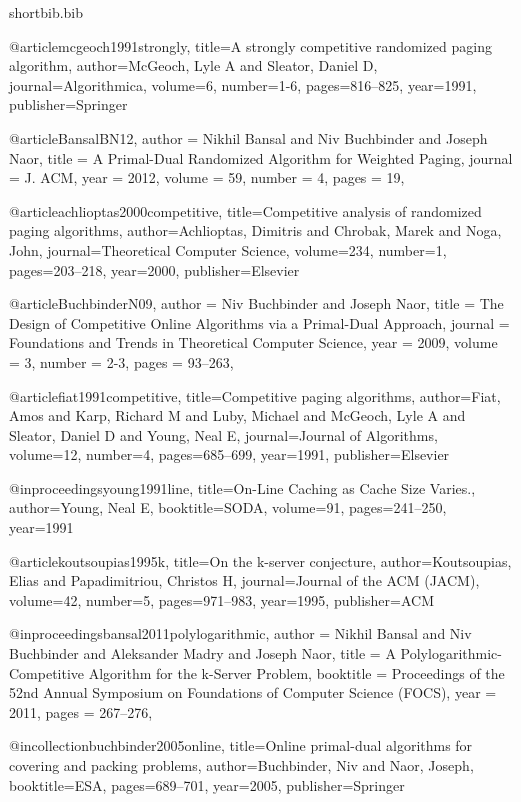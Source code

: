 \documentclass[11pt]{article}
\begin{document}
\begin{filecontents}{shortbib.bib}

@article{mcgeoch1991strongly,
  title={A strongly competitive randomized paging algorithm},
  author={McGeoch, Lyle A and Sleator, Daniel D},
  journal={Algorithmica},
  volume={6},
  number={1-6},
  pages={816--825},
  year={1991},
  publisher={Springer}
}

@article{BansalBN12,
  author    = {Nikhil Bansal and
               Niv Buchbinder and
               Joseph Naor},
  title     = {A Primal-Dual Randomized Algorithm for Weighted Paging},
  journal   = {J. {ACM}},
  year      = {2012},
  volume    = {59},
  number    = {4},
  pages     = {19},
}

@article{achlioptas2000competitive,
  title={Competitive analysis of randomized paging algorithms},
  author={Achlioptas, Dimitris and Chrobak, Marek and Noga, John},
  journal={Theoretical Computer Science},
  volume={234},
  number={1},
  pages={203--218},
  year={2000},
  publisher={Elsevier}
}

@article{BuchbinderN09,
  author    = {Niv Buchbinder and
               Joseph Naor},
  title     = {The Design of Competitive Online Algorithms via a Primal-Dual Approach},
  journal   = {Foundations and Trends in Theoretical Computer Science},
  year      = {2009},
  volume    = {3},
  number    = {2-3},
  pages     = {93--263},
}

@article{fiat1991competitive,
  title={Competitive paging algorithms},
  author={Fiat, Amos and Karp, Richard M and Luby, Michael and McGeoch, Lyle A and Sleator, Daniel D and Young, Neal E},
  journal={Journal of Algorithms},
  volume={12},
  number={4},
  pages={685--699},
  year={1991},
  publisher={Elsevier}
}

@inproceedings{young1991line,
  title={On-Line Caching as Cache Size Varies.},
  author={Young, Neal E},
  booktitle={SODA},
  volume={91},
  pages={241--250},
  year={1991}
}

@article{koutsoupias1995k,
  title={On the k-server conjecture},
  author={Koutsoupias, Elias and Papadimitriou, Christos H},
  journal={Journal of the ACM (JACM)},
  volume={42},
  number={5},
  pages={971--983},
  year={1995},
  publisher={ACM}
}

@inproceedings{bansal2011polylogarithmic,
  author    = {Nikhil Bansal and
               Niv Buchbinder and
               Aleksander Madry and
               Joseph Naor},
  title     = {A Polylogarithmic-Competitive Algorithm for the k-Server Problem},
  booktitle = {Proceedings of the 52nd Annual Symposium on Foundations of Computer Science (FOCS)},
  year      = {2011},
  pages     = {267--276},
}

@incollection{buchbinder2005online,
  title={Online primal-dual algorithms for covering and packing problems},
  author={Buchbinder, Niv and Naor, Joseph},
  booktitle={ESA},
  pages={689--701},
  year={2005},
  publisher={Springer}
}

\end{filecontents}


\end{document}
